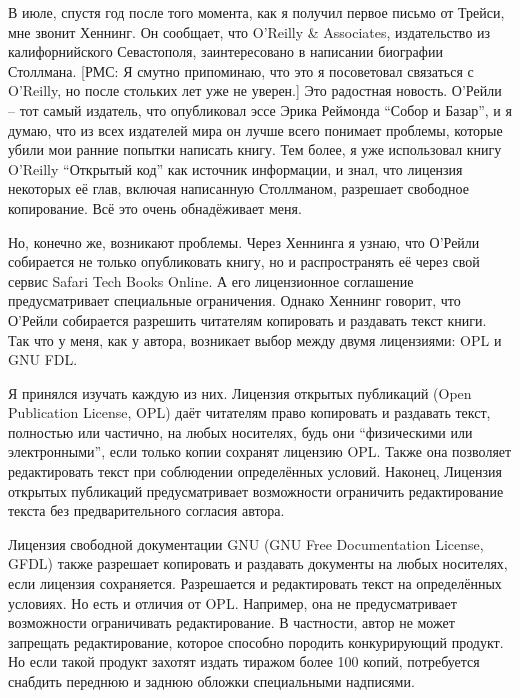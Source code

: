 В июле, спустя год после того момента, как я получил первое письмо от Трейси, мне звонит Хеннинг. Он сообщает, что O'Reilly \& Associates, издательство из калифорнийского Севастополя, заинтересовано в написании биографии Столлмана. [РМС: Я смутно припоминаю, что это я посоветовал связаться с O'Reilly, но после стольких лет уже не уверен.] Это радостная новость. О'Рейли -- тот самый издатель, что опубликовал эссе Эрика Реймонда ``Собор и Базар'', и я думаю, что из всех издателей мира он лучше всего понимает проблемы, которые убили мои ранние попытки написать книгу. Тем более, я уже использовал книгу O'Reilly ``Открытый код'' как источник информации, и знал, что лицензия некоторых её глав, включая написанную Столлманом, разрешает свободное копирование. Всё это очень обнадёживает меня.

Но, конечно же, возникают проблемы. Через Хеннинга я узнаю, что О'Рейли собирается не только опубликовать книгу, но и распространять её через свой сервис Safari Tech Books Online. А его лицензионное соглашение предусматривает специальные ограничения.  Однако Хеннинг говорит, что О'Рейли собирается разрешить читателям копировать и раздавать текст книги. Так что у меня, как у автора, возникает выбор между двумя лицензиями: OPL и GNU FDL.

Я принялся изучать каждую из них. Лицензия открытых публикаций (Open Publication License, OPL)  даёт читателям право копировать и раздавать текст, полностью или частично, на любых носителях, будь они ``физическими или электронными'', если только копии сохранят лицензию OPL. Также она позволяет редактировать текст при соблюдении определённых условий. Наконец, Лицензия открытых публикаций предусматривает возможности ограничить редактирование текста без предварительного согласия автора.

Лицензия свободной документации GNU (GNU Free Documentation License, GFDL) также разрешает копировать и раздавать документы на любых носителях, если лицензия сохраняется.  Разрешается и редактировать текст на определённых условиях. Но есть и отличия от OPL. Например, она не предусматривает возможности ограничивать редактирование. В частности, автор не может запрещать редактирование, которое способно породить конкурирующий продукт. Но если такой продукт захотят издать тиражом более 100 копий, потребуется снабдить переднюю и заднюю обложки специальными надписями.

